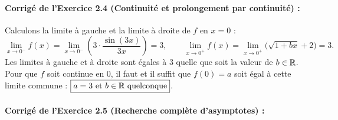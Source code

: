 \paragraph{Corrigé de l'Exercice 2.4 (Continuité et prolongement par continuité) :}
Calculons la limite à gauche et la limite à droite de $f$ en $x = 0$ :
\[
    \lim_{x \to 0^-} f(x) = \lim_{x \to 0^-} \left(3\cdot\frac{\sin(3x)}{3x}\right) = 3, \qquad \lim_{x \to 0^+} f(x) = \lim_{x \to 0^+} \bigl(\sqrt{1 + bx} + 2\bigr) = 3.
\]
Les limites à gauche et à droite sont égales à $3$ quelle que soit la valeur de $b \in \mathbb{R}$. Pour que $f$ soit continue en $0$, il faut et il suffit que $f(0) = a$ soit égal à cette limite commune : $\boxed{a = 3 \text{ et } b \in \mathbb{R} \text{ quelconque}}$.

\paragraph{Corrigé de l'Exercice 2.5 (Recherche complète d'asymptotes) :}
